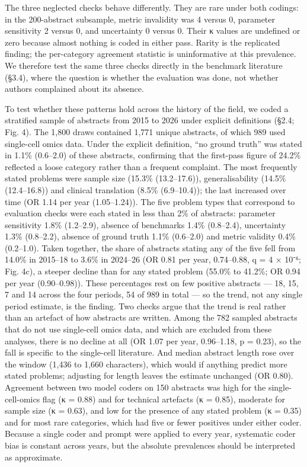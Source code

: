 \documentclass[11pt]{article}
\begin{document}
The three neglected checks behave differently. They are rare under both
codings: in the 200-abstract subsample, metric invalidity was 4 versus
0, parameter sensitivity 2 versus 0, and uncertainty 0 versus 0. Their κ
values are undefined or zero because almost nothing is coded in either
pass. Rarity is the replicated finding; the per-category agreement
statistic is uninformative at this prevalence. We therefore test the
same three checks directly in the benchmark literature (§3.4), where the
question is whether the evaluation was done, not whether authors
complained about its absence.

To test whether these patterns hold across the history of the field, we
coded a stratified sample of abstracts from 2015 to 2026 under explicit
definitions (§2.4; Fig. 4). The 1,800 draws contained 1,771 unique
abstracts, of which 989 used single-cell omics data. Under the explicit
definition, ``no ground truth'' was stated in 1.1\% (0.6--2.0) of these
abstracts, confirming that the first-pass figure of 24.2\% reflected a
loose category rather than a frequent complaint. The most frequently
stated problems were sample size (15.3\% (13.2--17.6)), generalisability
(14.5\% (12.4--16.8)) and clinical translation (8.5\% (6.9--10.4)); the
last increased over time (OR 1.14 per year (1.05--1.24)). The five
problem types that correspond to evaluation checks were each stated in
less than 2\% of abstracts: parameter sensitivity 1.8\% (1.2--2.9),
absence of benchmarks 1.4\% (0.8--2.4), uncertainty 1.3\% (0.8--2.2),
absence of ground truth 1.1\% (0.6--2.0) and metric validity 0.4\%
(0.2--1.0). Taken together, the share of abstracts stating any of the
five fell from 14.0\% in 2015--18 to 3.6\% in 2024--26 (OR 0.81 per
year, 0.74--0.88, q = 4 × 10⁻⁶; Fig. 4c), a steeper decline than for any
stated problem (55.0\% to 41.2\%; OR 0.94 per year (0.90--0.98)). These
percentages rest on few positive abstracts --- 18, 15, 7 and 14 across
the four periods, 54 of 989 in total --- so the trend, not any single
period estimate, is the finding. Two checks argue that the trend is real
rather than an artefact of how abstracts are written. Among the 782
sampled abstracts that do not use single-cell omics data, and which are
excluded from these analyses, there is no decline at all (OR 1.07 per
year, 0.96--1.18, p = 0.23), so the fall is specific to the single-cell
literature. And median abstract length rose over the window (1,436 to
1,660 characters), which would if anything predict more stated problems;
adjusting for length leaves the estimate unchanged (OR 0.80). Agreement
between two model coders on 150 abstracts was high for the
single-cell-omics flag (κ = 0.88) and for technical artefacts (κ =
0.85), moderate for sample size (κ = 0.63), and low for the presence of
any stated problem (κ = 0.35) and for most rare categories, which had
five or fewer positives under either coder. Because a single coder and
prompt were applied to every year, systematic coder bias is constant
across years, but the absolute prevalences should be interpreted as
approximate.
\end{document}
